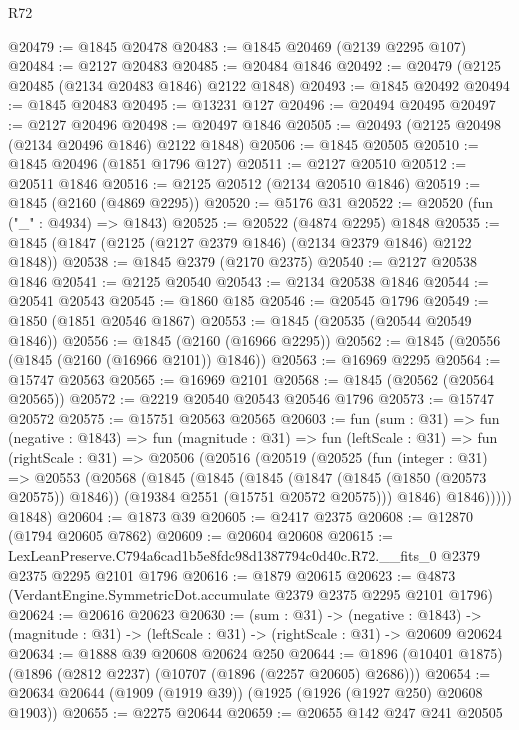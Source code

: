 \begin{lexlean}{R72}
\begin{coremodule}
@20479 := @1845 @20478
@20483 := @1845 @20469 (@2139 @2295 @107)
@20484 := @2127 @20483
@20485 := @20484 @1846
@20492 := @20479 (@2125 @20485 (@2134 @20483 @1846) @2122 @1848)
@20493 := @1845 @20492
@20494 := @1845 @20483
@20495 := @13231 @127
@20496 := @20494 @20495
@20497 := @2127 @20496
@20498 := @20497 @1846
@20505 := @20493 (@2125 @20498 (@2134 @20496 @1846) @2122 @1848)
@20506 := @1845 @20505
@20510 := @1845 @20496 (@1851 @1796 @127)
@20511 := @2127 @20510
@20512 := @20511 @1846
@20516 := @2125 @20512 (@2134 @20510 @1846)
@20519 := @1845 (@2160 (@4869 @2295))
@20520 := @5176 @31
@20522 := @20520 (fun ("_" : @4934) => @1843)
@20525 := @20522 (@4874 @2295) @1848
@20535 := @1845 (@1847 (@2125 (@2127 @2379 @1846) (@2134 @2379 @1846) @2122 @1848))
@20538 := @1845 @2379 (@2170 @2375)
@20540 := @2127 @20538 @1846
@20541 := @2125 @20540
@20543 := @2134 @20538 @1846
@20544 := @20541 @20543
@20545 := @1860 @185
@20546 := @20545 @1796
@20549 := @1850 (@1851 @20546 @1867)
@20553 := @1845 (@20535 (@20544 @20549 @1846))
@20556 := @1845 (@2160 (@16966 @2295))
@20562 := @1845 (@20556 (@1845 (@2160 (@16966 @2101)) @1846))
@20563 := @16969 @2295
@20564 := @15747 @20563
@20565 := @16969 @2101
@20568 := @1845 (@20562 (@20564 @20565))
@20572 := @2219 @20540 @20543 @20546 @1796
@20573 := @15747 @20572
@20575 := @15751 @20563 @20565
@20603 := fun (sum : @31) =>
  fun (negative : @1843) =>
  fun (magnitude : @31) =>
  fun (leftScale : @31) =>
  fun (rightScale : @31) =>
  @20506
    (@20516
      (@20519
        (@20525
          (fun (integer : @31) =>
          @20553
            (@20568
              (@1845
                (@1845
                  (@1845
                    (@1847 (@1845 (@1850 (@20573 @20575)) @1846))
                    (@19384 @2551 (@15751 @20572 @20575)))
                  @1846)
                @1846)))))
      @1848)
@20604 := @1873 @39
@20605 := @2417 @2375
@20608 := @12870 (@1794 @20605 @7862)
@20609 := @20604 @20608
@20615 := LexLeanPreserve.C794a6cad1b5e8fdc98d1387794c0d40c.R72.__fits_0
    @2379
    @2375
    @2295
    @2101
    @1796
@20616 := @1879 @20615
@20623 := @4873 (VerdantEngine.SymmetricDot.accumulate @2379 @2375 @2295 @2101 @1796)
@20624 := @20616 @20623
@20630 := (sum : @31) ->
  (negative : @1843) ->
  (magnitude : @31) -> (leftScale : @31) -> (rightScale : @31) -> @20609 @20624
@20634 := @1888 @39 @20608 @20624 @250
@20644 := @1896 (@10401 @1875) (@1896 (@2812 @2237) (@10707 (@1896 (@2257 @20605) @2686)))
@20654 := @20634 @20644 (@1909 (@1919 @39)) (@1925 (@1926 (@1927 @250) @20608 @1903))
@20655 := @2275 @20644
@20659 := @20655 @142 @247 @241 @20505

\end{coremodule}
\end{lexlean}
